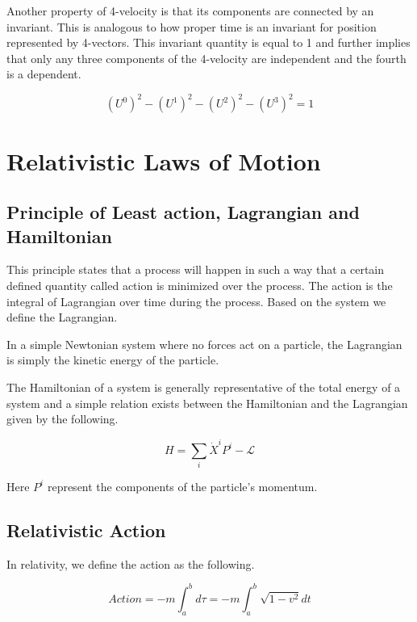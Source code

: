\documentclass[16pt]{scrartcl}
\numberwithin{equation}{section}
\theoremstyle{plain}
\theoremstyle{definition}
\begin{document}
Another property of 4-velocity is that its components are connected by an invariant. This is analogous to how proper time is an invariant for position represented by 4-vectors. This invariant quantity is equal to 1 and further implies that only any three components of the 4-velocity are independent and the fourth is a dependent.

\begin{equation}
    (U^0)^2 - (U^1)^2 - (U^2)^2 - (U^3)^2 = 1
    \label{eq:4vel-invariant}
\end{equation}

\section{Relativistic Laws of Motion}

\subsection{Principle of Least action, Lagrangian and Hamiltonian}

This principle states that a process will happen in such a way that a certain defined quantity called action is minimized over the process. The action is the integral of Lagrangian over time during the process. Based on the system we define the Lagrangian.

In a simple Newtonian system where no forces act on a particle, the Lagrangian is simply the kinetic energy of the particle.

The Hamiltonian of a system is generally representative of the total energy of a system and a simple relation exists between the Hamiltonian and the Lagrangian given by the following.

\begin{equation}
    H = \sum_i \dot X^i P^i - \mathcal{L}
    \label{eq:ham-lag}
\end{equation}

Here $P^i$ represent the components of the particle's momentum.

\subsection{Relativistic Action}

In relativity, we define the action as the following.

\begin{equation}
    Action = -m \int_a^b d\tau = -m \int_a^b \sqrt{1-v^2} dt
    \label{eq:rel-action}
\end{equation}
\end{document}
